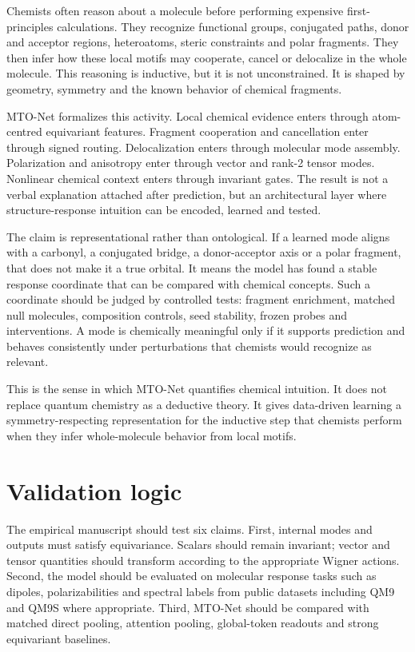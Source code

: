 \documentclass[11pt]{article}
\begin{document}
Chemists often reason about a molecule before performing expensive first-principles calculations. They recognize functional groups, conjugated paths, donor and acceptor regions, heteroatoms, steric constraints and polar fragments. They then infer how these local motifs may cooperate, cancel or delocalize in the whole molecule. This reasoning is inductive, but it is not unconstrained. It is shaped by geometry, symmetry and the known behavior of chemical fragments.

MTO-Net formalizes this activity. Local chemical evidence enters through atom-centred equivariant features. Fragment cooperation and cancellation enter through signed routing. Delocalization enters through molecular mode assembly. Polarization and anisotropy enter through vector and rank-2 tensor modes. Nonlinear chemical context enters through invariant gates. The result is not a verbal explanation attached after prediction, but an architectural layer where structure-response intuition can be encoded, learned and tested.

The claim is representational rather than ontological. If a learned mode aligns with a carbonyl, a conjugated bridge, a donor-acceptor axis or a polar fragment, that does not make it a true orbital. It means the model has found a stable response coordinate that can be compared with chemical concepts. Such a coordinate should be judged by controlled tests: fragment enrichment, matched null molecules, composition controls, seed stability, frozen probes and interventions. A mode is chemically meaningful only if it supports prediction and behaves consistently under perturbations that chemists would recognize as relevant.

This is the sense in which MTO-Net quantifies chemical intuition. It does not replace quantum chemistry as a deductive theory. It gives data-driven learning a symmetry-respecting representation for the inductive step that chemists perform when they infer whole-molecule behavior from local motifs.

\section*{Validation logic}

The empirical manuscript should test six claims. First, internal modes and outputs must satisfy equivariance. Scalars should remain invariant; vector and tensor quantities should transform according to the appropriate Wigner actions. Second, the model should be evaluated on molecular response tasks such as dipoles, polarizabilities and spectral labels from public datasets including QM9 and QM9S where appropriate\citep{Ramakrishnan2014QM9,Zou2023QM9S}. Third, MTO-Net should be compared with matched direct pooling, attention pooling, global-token readouts and strong equivariant baselines.
\end{document}
